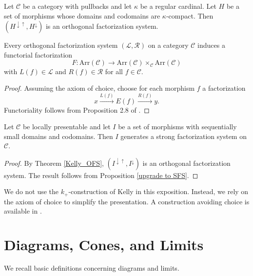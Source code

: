 \documentclass{tac}
\begin{document}
\begin{theorem}\label{Kelly_OFS}
Let $\mathcal{C}$ be a category with pullbacks and let $\kappa$ be a regular cardinal. Let $H$ be a set of morphisms whose domains and codomains are $\kappa$-compact. Then $(H^{\downarrow\uparrow}, H^{\downarrow})$ is an orthogonal factorization system.
\end{theorem}

\begin{proposition}\label{upgrade to SFS}
Every orthogonal factorization system $(\mathcal{L},\mathcal{R})$ on a category $\mathcal{C}$ induces a functorial factorization
\[
F : \mathrm{Arr}(\mathcal{C}) \to \mathrm{Arr}(\mathcal{C}) \times_{\mathcal{C}} \mathrm{Arr}(\mathcal{C})
\]
with $L(f) \in \mathcal{L}$ and $R(f) \in \mathcal{R}$ for all $f \in \mathcal{C}$.
\end{proposition}

\begin{proof}
Assuming the axiom of choice, choose for each morphism $f$ a factorization
\[
x \xrightarrow{L(f)} E(f) \xrightarrow{R(f)} y.
\]
Functoriality follows from Proposition 2.8 of \cite{Garn3}.
\end{proof}

\begin{corollary}\label{Kelly_SOA}
Let $\mathcal{C}$ be locally presentable and let $I$ be a set of morphisms with sequentially small domains and codomains. Then $I$ generates a strong factorization system on $\mathcal{C}$.
\end{corollary}

\begin{proof}
By Theorem \ref{Kelly_OFS}, $(I^{\downarrow\uparrow}, I^{\downarrow})$ is an orthogonal factorization system. The result follows from Proposition \ref{upgrade to SFS}.
\end{proof}

\medskip

We do not use the $k_{+}$-construction of Kelly \cite{Kell} in this exposition. Instead, we rely on the axiom of choice to simplify the presentation. A construction avoiding choice is available in \cite{Kell}.

\section{Diagrams, Cones, and Limits}

We recall basic definitions concerning diagrams and limits.
\end{document}
